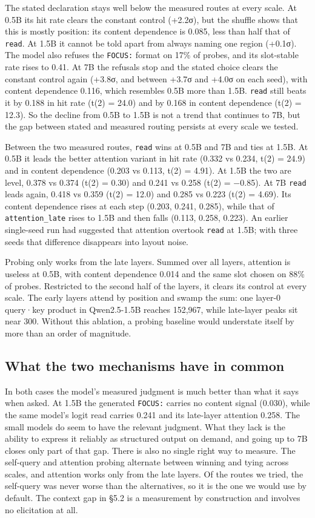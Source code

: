 \documentclass[10pt]{article}
\begin{document}
The stated declaration stays well below the measured routes at every scale. At 0.5B its
hit rate clears the constant control (+2.2σ), but the shuffle shows that this is mostly
position: its content dependence is 0.085, less than half that of \texttt{read}. At 1.5B it cannot
be told apart from always naming one region (+0.1σ). The model also refuses the \texttt{FOCUS:}
format on 17\% of probes, and its slot-stable rate rises to 0.41. At 7B the refusals stop and
the stated choice clears the constant control again (+3.8σ, and between +3.7σ and +4.0σ on
each seed), with content dependence 0.116, which resembles 0.5B more than 1.5B. \texttt{read} still
beats it by 0.188 in hit rate (t(2) = 24.0) and by 0.168 in content dependence
(t(2) = 12.3). So the decline from 0.5B to 1.5B is not a trend that continues to 7B, but the
gap between stated and measured routing persists at every scale we tested.

Between the two measured routes, \texttt{read} wins at 0.5B and 7B and ties at 1.5B. At 0.5B it
leads the better attention variant in hit rate (0.332 vs 0.234, t(2) = 24.9) and in content
dependence (0.203 vs 0.113, t(2) = 4.91). At 1.5B the two are level, 0.378 vs 0.374
(t(2) = 0.30) and 0.241 vs 0.258 (t(2) = −0.85). At 7B \texttt{read} leads again, 0.418 vs 0.359
(t(2) = 12.0) and 0.285 vs 0.223 (t(2) = 4.69). Its content dependence rises at each step
(0.203, 0.241, 0.285), while that of \texttt{attention\_late} rises to 1.5B and then falls
(0.113, 0.258, 0.223). An earlier single-seed run had suggested that attention overtook
\texttt{read} at 1.5B; with three seeds that difference disappears into layout noise.

Probing only works from the late layers. Summed over all layers, attention is useless at
0.5B, with content dependence 0.014 and the same slot chosen on 88\% of probes. Restricted to
the second half of the layers, it clears its control at every scale. The early layers attend
by position and swamp the sum: one layer-0 query·key product in Qwen2.5-1.5B reaches
152,967, while late-layer peaks sit near 300. Without this ablation, a probing baseline would
understate itself by more than an order of magnitude.

\subsection{What the two mechanisms have in common}

In both cases the model's measured judgment is much better than what it says when asked. At
1.5B the generated \texttt{FOCUS:} carries no content signal (0.030), while the same model's logit
read carries 0.241 and its late-layer attention 0.258. The small models do seem to have the
relevant judgment. What they lack is the ability to express it reliably as structured output
on demand, and going up to 7B closes only part of that gap. There is also no single right
way to measure. The self-query and attention probing alternate between winning and tying
across scales, and attention works only from the late layers. Of the routes we tried, the
self-query was never worse than the alternatives, so it is the one we would use by default.
The context gap in §5.2 is a measurement by construction and involves no elicitation at all.
\end{document}
